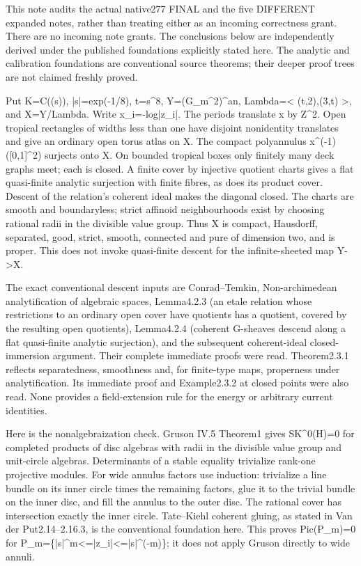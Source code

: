 \documentclass[11pt]{article}
\begin{document}
This note audits the actual native277 FINAL and the five DIFFERENT expanded notes, rather than treating either as an incoming correctness grant. There are no incoming note grants. The conclusions below are independently derived under the published foundations explicitly stated here. The analytic and calibration foundations are conventional source theorems; their deeper proof trees are not claimed freshly proved.

Put K=C((s)), |s|=exp(-1/8), t=s\textasciicircum{}8, Y=(G\_m\textasciicircum{}2)\textasciicircum{}an, Lambda=< (t,2),(3,t) >, and X=Y/Lambda. Write x\_i=-log|z\_i|. The periods translate x by Z\textasciicircum{}2. Open tropical rectangles of widths less than one have disjoint nonidentity translates and give an ordinary open torus atlas on X. The compact polyannulus x\textasciicircum{}(-1)([0,1]\textasciicircum{}2) surjects onto X. On bounded tropical boxes only finitely many deck graphs meet; each is closed. A finite cover by injective quotient charts gives a flat quasi-finite analytic surjection with finite fibres, as does its product cover. Descent of the relation's coherent ideal makes the diagonal closed. The charts are smooth and boundaryless; strict affinoid neighbourhoods exist by choosing rational radii in the divisible value group. Thus X is compact, Hausdorff, separated, good, strict, smooth, connected and pure of dimension two, and is proper. This does not invoke quasi-finite descent for the infinite-sheeted map Y->X.

The exact conventional descent inputs are Conrad--Temkin, Non-archimedean analytification of algebraic spaces, Lemma4.2.3 (an etale relation whose restrictions to an ordinary open cover have quotients has a quotient, covered by the resulting open quotients), Lemma4.2.4 (coherent G-sheaves descend along a flat quasi-finite analytic surjection), and the subsequent coherent-ideal closed-immersion argument. Their complete immediate proofs were read. Theorem2.3.1 reflects separatedness, smoothness and, for finite-type maps, properness under analytification. Its immediate proof and Example2.3.2 at closed points were also read. None provides a field-extension rule for the energy or arbitrary current identities.

Here is the nonalgebraization check. Gruson IV.5 Theorem1 gives SK\textasciicircum{}0(H)=0 for completed products of disc algebras with radii in the divisible value group and unit-circle algebras. Determinants of a stable equality trivialize rank-one projective modules. For wide annulus factors use induction: trivialize a line bundle on its inner circle times the remaining factors, glue it to the trivial bundle on the inner disc, and fill the annulus to the outer disc. The rational cover has intersection exactly the inner circle. Tate--Kiehl coherent gluing, as stated in Van der Put2.14--2.16.3, is the conventional foundation here. This proves Pic(P\_m)=0 for P\_m=\{|s|\textasciicircum{}m<=|z\_i|<=|s|\textasciicircum{}(-m)\}; it does not apply Gruson directly to wide annuli.
\end{document}
